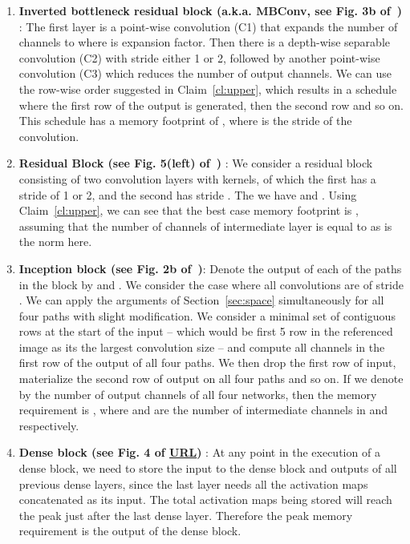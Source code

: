 \documentclass[10pt]{article}
\begin{document}
\begin{enumerate}[leftmargin=*]
  \item \textbf{Inverted bottleneck residual block (a.k.a. MBConv, see
    Fig. 3b of~\citep{sandler2018mobilenetv2})} : The first layer is a
    point-wise convolution (C1) that expands the number of channels to
     where  is expansion factor. Then there is a
    depth-wise separable  convolution (C2) with stride
    either 1 or 2, followed by another point-wise convolution (C3)
    which reduces the number of output channels.  We can use the
    row-wise order suggested in Claim~\ref{cl:upper}, which results in
    a schedule where the first row of the output is generated, then
    the second row and so on. This schedule has a memory footprint of
    , where  is the stride of the  convolution.





  \item \textbf{Residual Block (see Fig. 5(left)
    of~\citep{he2016deep})} : We consider a residual block consisting
    of two convolution layers with  kernels, of which the
    first has a stride  of 1 or 2, and the second has stride .
    The we have  and .  Using
    Claim~\ref{cl:upper}, we can see that the best case memory
    footprint is ,
    assuming that the number of channels of intermediate layer is
    equal to  as is the norm here.



  \item \textbf{Inception block (see Fig. 2b
    of~\citep{szegedy2015going})}: Denote the output of each of the
     paths in the block by  and . We consider
    the case where all convolutions are of stride . We can apply
    the arguments of Section~\ref{sec:space} simultaneously for all
    four paths with slight modification.  We consider a minimal set of
    contiguous rows at the start of the input -- which would be first
    5 row in the referenced image as its the largest convolution size
    -- and compute all channels in the first row of the output of all
    four paths.  We then drop the first row of input, materialize the
    second row of output on all four paths and so on. If we denote by
     the number of output channels of all four networks, then
    the memory requirement is , where  and  are the number of intermediate
    channels in  and  respectively.



    
  \item \textbf{Dense block (see Fig. 4 of
    \href{https://towardsdatascience.com/understanding-and-visualizing-densenets-7f688092391a?gi=94436891b97}{URL})}
    : At any point in the execution of a dense block, we need to store the input to the dense block and outputs of all previous dense layers, since the last layer needs all the activation maps concatenated as its input. The total activation maps being stored will reach the peak just after the last dense layer. Therefore the peak memory requirement is the output of the dense block.
\end{enumerate}
\end{document}
